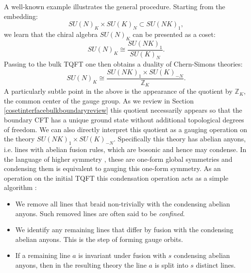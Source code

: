 \documentclass[11pt]{article}
\numberwithin{equation}{section}
\begin{document}
A well-known example illustrates the general procedure.  Starting from the embedding:
\begin{equation}\label{unitaryembedintro}
SU(N)_{K}\times SU(K)_{N}\subset SU(NK)_{1},
\end{equation}
we learn that the chiral algebra $SU(N)_{K}$ can be presented as a coset:
\begin{equation}
    SU(N)_{K}\cong \frac{SU(NK)_{1}}{SU(K)_{N}}.
\end{equation}
Passing to the bulk TQFT one then obtains a duality of Chern-Simons theories:
\begin{equation} \label{UnitaryCSExample}
    SU(N)_{K}\cong \frac{SU(NK)_{1}\times SU(K)_{-N}}{\mathbb{Z}_{K}}.
\end{equation}
A particularly subtle point in the above is the appearance of the quotient by $\mathbb{Z}_{K},$ the common center of the gauge group. As we review in Section \ref{cosetinterfacebulkboundaryreview} this quotient necessarily appears so that the boundary CFT has a unique ground state without additional topological degrees of freedom.  We can also directly interpret this quotient as a gauging operation on the theory $SU(NK)_{1}\times SU(K)_{-N}$.  Specifically this theory has abelian anyons, i.e. lines with abelian fusion rules, which are bosonic and hence may condense.  In the language of higher symmetry \cite{Kapustin:2014gua,Gaiotto:2014kfa}, these are one-form global symmetries and condensing them is equivalent to gauging this one-form symmetry.  As an operation on the initial TQFT this condensation operation acts as a simple algorithm \cite{Moore:1989yh,Hsin:2018vcg}:
\begin{itemize}
    \item We remove all lines that braid non-trivially with the condensing abelian anyons.  Such removed lines are often said to be \emph{confined}.
    \item We identify any remaining lines that differ by fusion with the condensing abelian anyons.  This is the step of forming gauge orbits.
    \item If a remaining line $a$ is invariant under fusion with $s$ condensing abelian anyons, then in the resulting theory the line $a$ is split into $s$ distinct lines. 
\end{itemize}
\end{document}
